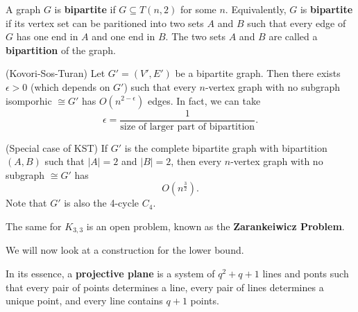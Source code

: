 
\begin{definition}
	A graph \( G \) is \textbf{bipartite} if \( G \subseteq T(n, 2) \) for some \( n \). Equivalently, \( G \) is \textbf{bipartite} if its vertex set can be paritioned into two sets \( A \) and \( B \) such that every edge of \( G \) has one end in \( A \) and one end in \( B \). The two sets \( A \) and \( B \) are called a \textbf{bipartition} of the graph.
\end{definition}

\begin{theorem}
	(Kovori-Sos-Turan) Let \( G'=(V',E') \) be a bipartite graph. Then there exists \( \epsilon >0 \) (which depends on \( G' \)) such that every \( n \)-vertex graph with no subgraph isomporhic \( \cong G' \) has \( O(n^{2-\epsilon } ) \) edges. In fact, we can take \[
		\epsilon = \frac{1}{\text{size of larger part of bipartition}}
	.\] 
\end{theorem}

\begin{theorem}
	(Special case of KST) If \( G' \) is the complete bipartite graph with bipartition \( (A,B) \) such that \( |A|=2 \) and \( |B|=2 \), then every \( n \)-vertex graph with no subgraph \( \cong G' \) has \[
		O(n^{\frac{3}{2}} )
	.\] Note that \( G' \) is also the 4-cycle \( C_4 \).
\end{theorem}

\begin{note}
	The same for \( K_{3,3} \) is an open problem, known as the \textbf{Zarankeiwicz Problem}.
\end{note}

We will now look at a construction for the lower bound.

\begin{definition}
	In its essence, a \textbf{projective plane} is a system of \( q^{2} + q + 1  \) lines and ponts such that every pair of points determines a line, every pair of lines determines a unique point, and every line contains \( q+1 \) points.
\end{definition}
